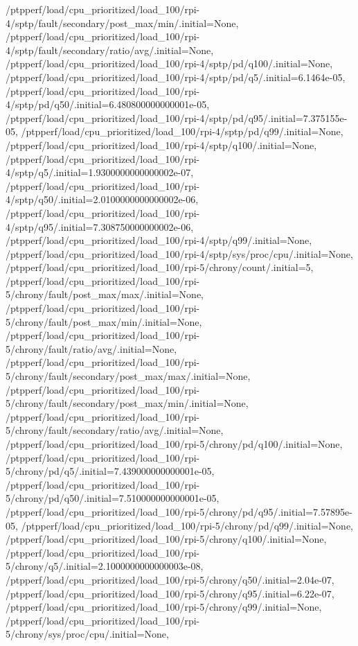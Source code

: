 {    /ptpperf/load/cpu_prioritized/load_100/rpi-4/sptp/fault/secondary/post_max/min/.initial=None,
    /ptpperf/load/cpu_prioritized/load_100/rpi-4/sptp/fault/secondary/ratio/avg/.initial=None,
    /ptpperf/load/cpu_prioritized/load_100/rpi-4/sptp/pd/q100/.initial=None,
    /ptpperf/load/cpu_prioritized/load_100/rpi-4/sptp/pd/q5/.initial=6.1464e-05,
    /ptpperf/load/cpu_prioritized/load_100/rpi-4/sptp/pd/q50/.initial=6.480800000000001e-05,
    /ptpperf/load/cpu_prioritized/load_100/rpi-4/sptp/pd/q95/.initial=7.375155e-05,
    /ptpperf/load/cpu_prioritized/load_100/rpi-4/sptp/pd/q99/.initial=None,
    /ptpperf/load/cpu_prioritized/load_100/rpi-4/sptp/q100/.initial=None,
    /ptpperf/load/cpu_prioritized/load_100/rpi-4/sptp/q5/.initial=1.9300000000000002e-07,
    /ptpperf/load/cpu_prioritized/load_100/rpi-4/sptp/q50/.initial=2.0100000000000002e-06,
    /ptpperf/load/cpu_prioritized/load_100/rpi-4/sptp/q95/.initial=7.308750000000002e-06,
    /ptpperf/load/cpu_prioritized/load_100/rpi-4/sptp/q99/.initial=None,
    /ptpperf/load/cpu_prioritized/load_100/rpi-4/sptp/sys/proc/cpu/.initial=None,
    /ptpperf/load/cpu_prioritized/load_100/rpi-5/chrony/count/.initial=5,
    /ptpperf/load/cpu_prioritized/load_100/rpi-5/chrony/fault/post_max/max/.initial=None,
    /ptpperf/load/cpu_prioritized/load_100/rpi-5/chrony/fault/post_max/min/.initial=None,
    /ptpperf/load/cpu_prioritized/load_100/rpi-5/chrony/fault/ratio/avg/.initial=None,
    /ptpperf/load/cpu_prioritized/load_100/rpi-5/chrony/fault/secondary/post_max/max/.initial=None,
    /ptpperf/load/cpu_prioritized/load_100/rpi-5/chrony/fault/secondary/post_max/min/.initial=None,
    /ptpperf/load/cpu_prioritized/load_100/rpi-5/chrony/fault/secondary/ratio/avg/.initial=None,
    /ptpperf/load/cpu_prioritized/load_100/rpi-5/chrony/pd/q100/.initial=None,
    /ptpperf/load/cpu_prioritized/load_100/rpi-5/chrony/pd/q5/.initial=7.439000000000001e-05,
    /ptpperf/load/cpu_prioritized/load_100/rpi-5/chrony/pd/q50/.initial=7.510000000000001e-05,
    /ptpperf/load/cpu_prioritized/load_100/rpi-5/chrony/pd/q95/.initial=7.57895e-05,
    /ptpperf/load/cpu_prioritized/load_100/rpi-5/chrony/pd/q99/.initial=None,
    /ptpperf/load/cpu_prioritized/load_100/rpi-5/chrony/q100/.initial=None,
    /ptpperf/load/cpu_prioritized/load_100/rpi-5/chrony/q5/.initial=2.1000000000000003e-08,
    /ptpperf/load/cpu_prioritized/load_100/rpi-5/chrony/q50/.initial=2.04e-07,
    /ptpperf/load/cpu_prioritized/load_100/rpi-5/chrony/q95/.initial=6.22e-07,
    /ptpperf/load/cpu_prioritized/load_100/rpi-5/chrony/q99/.initial=None,
    /ptpperf/load/cpu_prioritized/load_100/rpi-5/chrony/sys/proc/cpu/.initial=None,
}
